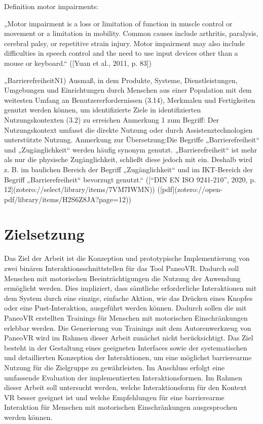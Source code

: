 Definition motor impairments:
    
„Motor impairment is a loss or limitation of function in muscle control or movement or a limitation in mobility. Common causes include arthritis, paralysis, cerebral palsy, or repetitive strain injury. Motor impairment may also include difficulties in speech control and the need to use input devices other than a mouse or keyboard.“ ([Yuan et al., 2011, p. 83])

„BarrierefreiheitN1) Ausmaß, in dem Produkte, Systeme, Dienstleistungen, Umgebungen und Einrichtungen durch Menschen aus einer Population mit dem weitesten Umfang an Benutzererfordernissen (3.14), Merkmalen und Fertigkeiten genutzt werden können, um identifizierte Ziele in identifizierten Nutzungskontexten (3.2) zu erreichen Anmerkung 1 zum Begriff: Der Nutzungskontext umfasst die direkte Nutzung oder durch Assistenztechnologien unterstützte Nutzung. Anmerkung zur Übersetzung:Die Begriffe „Barrierefreiheit“ und „Zugänglichkeit“ werden häufig synonym genutzt. „Barrierefreiheit“ ist mehr als nur die physische Zugänglichkeit, schließt diese jedoch mit ein. Deshalb wird z. B. im baulichen Bereich der Begriff „Zugänglichkeit“ und im IKT-Bereich der Begriff „Barrierefreiheit“ bevorzugt genutzt.“ ([“DIN EN ISO 9241-210”, 2020, p. 12](zotero://select/library/items/7VM7IWMN)) ([pdf](zotero://open-pdf/library/items/H2S6Z8JA?page=12))


\section{Zielsetzung}

Das Ziel der Arbeit ist die Konzeption und prototypische Implementierung von zwei binären Interaktionsschnittstellen für das Tool PaneoVR. Dadurch soll Menschen mit motorischen Beeinträchtigungen die Nutzung der Anwendung ermöglicht werden. Dies impliziert, dass sämtliche erforderliche Interaktionen mit dem System durch eine einzige, einfache Aktion, wie das Drücken eines Knopfes oder eine Pust-Interaktion, ausgeführt werden können. Dadurch sollen die mit PaneoVR erstellten Trainings für Menschen mit motorischen Einschränkungen erlebbar werden. Die Generierung von Trainings mit dem Autorenwerkzeug von PaneoVR wird im Rahmen dieser Arbeit zunächst nicht berücksichtigt. Das Ziel besteht in der Gestaltung eines geeigneten Interfaces sowie der systematischen und detaillierten Konzeption der Interaktionen, um eine möglichst barrierearme Nutzung für die Zielgruppe zu gewährleisten. Im Anschluss erfolgt eine umfassende Evaluation der implementierten Interaktionsformen. Im Rahmen dieser Arbeit soll untersucht werden, welche Interaktionsform für den Kontext VR besser geeignet ist und welche Empfehlungen für eine barrierearme Interaktion für Menschen mit motorischen Einschränkungen ausgesprochen werden können. 


